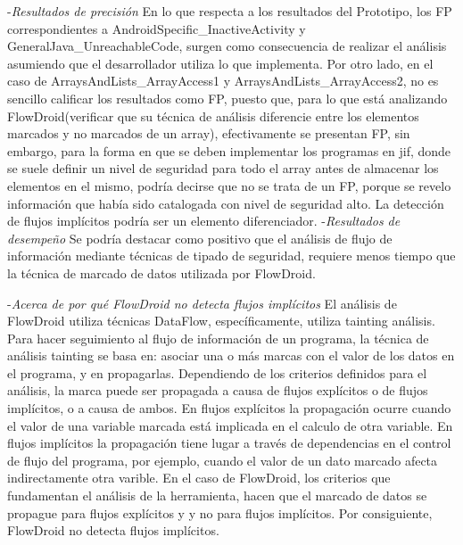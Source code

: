 -\textit{Resultados de precisión}\newline
En lo que respecta a los resultados del Prototipo, los FP correspondientes a
AndroidSpecific\_InactiveActivity y GeneralJava\_UnreachableCode, surgen como
consecuencia de realizar el análisis asumiendo que el desarrollador utiliza lo
que implementa.\newline 
Por otro lado, en el caso de ArraysAndLists\_ArrayAccess1 y
ArraysAndLists\_ArrayAccess2, no es sencillo calificar los resultados como FP,
puesto que, para lo que está analizando FlowDroid(verificar que su técnica de
análisis diferencie entre los elementos marcados y no marcados de un array),
efectivamente se presentan FP, sin embargo, para la forma en que se deben
implementar los programas en jif, donde se suele definir un nivel de seguridad
para todo el array antes de almacenar los elementos en el mismo, podría decirse
que no se trata de un FP, porque se revelo información que había sido
catalogada con nivel de seguridad alto.\newline 
La detección de flujos implícitos podría ser un elemento diferenciador.\newline
-\textit{Resultados de desempeño}\newline
Se podría destacar como positivo que el análisis de flujo de información
mediante técnicas de tipado de seguridad, requiere menos tiempo que la técnica
de marcado de datos utilizada por FlowDroid.

-\textit{Acerca de por qué FlowDroid no detecta flujos implícitos}\newline
El análisis de FlowDroid utiliza técnicas DataFlow, específicamente, utiliza
tainting análisis. Para hacer seguimiento al flujo de información de un
programa, la técnica de análisis tainting se basa en: asociar una o más marcas
con el valor de los datos en el programa, y en propagarlas. Dependiendo de los
criterios definidos para el análisis, la marca puede ser propagada a causa de
flujos explícitos o de flujos implícitos, o a causa de ambos. En flujos
explícitos la propagación ocurre cuando el valor de una variable marcada está
implicada en el calculo de otra variable. En flujos implícitos la propagación
tiene lugar a través de dependencias en el control de flujo del programa, por
ejemplo, cuando el valor de un dato marcado afecta indirectamente otra varible.\newline 
En el caso de FlowDroid, los criterios que fundamentan el análisis de la
herramienta, hacen que el marcado de datos se propague para flujos explícitos y
y no para flujos implícitos. Por consiguiente, FlowDroid no detecta flujos
implícitos.

